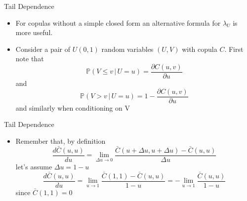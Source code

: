 \documentclass[11pt]{beamer}
\theoremstyle{plain}
\theoremstyle{definition}
\theoremstyle{remark}
\begin{document}
%
\begin{frame}{Tail Dependence}
   \begin{itemize}
		\item For copulas without a simple closed form an alternative formula for $\lambda_U$ is more 
		useful.
		\item Consider a pair of $U(0,1)$ random variables $(U,V)$ with copula $C$. First note that  
		\begin{equation}
		\mathbb{P} (V \le v \, | \, U = u) = \frac{\partial C(u,v)}{\partial u}
		\end{equation}
		and
		\begin{equation}
		\mathbb{P} (V > v \, | \, U = u) = 1- \frac{\partial C(u,v)}{\partial u}
		\end{equation}
		and similarly when conditioning on V
	\end{itemize}
\end{frame}
%
\begin{frame}{Tail Dependence}
   \begin{itemize}
		\item Remember that, by definition
			$$
			\frac{d\bar C(u,u)}{du} = \lim\limits_{\Delta u\rightarrow 0} \frac{\bar C(u+\Delta u,u+
			\Delta u) - \bar C(u,u) }{\Delta u}
			$$
			let's assume $\Delta u = 1-u$
			$$
			\frac{d\bar C(u,u)}{du} = \lim\limits_{u\rightarrow 1} \frac{\bar C(1, 1) - \bar C(u,u) }{1- u} 
			= -\lim\limits_{u\rightarrow 1} \frac{\bar C(u,u) }{1- u} 
			$$
			since $\bar C(1,1)=0$ 
	\end{itemize}
\end{frame}
%
\end{document}
